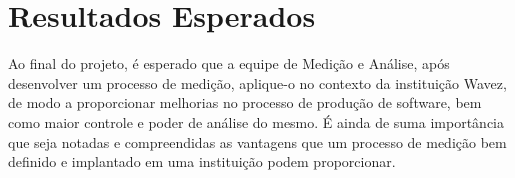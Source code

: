 \chapter{Resultados Esperados}

Ao final do projeto, é esperado que a equipe de Medição e Análise, após desenvolver um processo de medição, aplique-o no contexto da instituição Wavez, de modo a proporcionar melhorias no processo de produção de software, bem como maior controle e poder de análise do mesmo. 
É ainda de suma importância que seja notadas e compreendidas as vantagens que um processo de medição bem definido e implantado em uma instituição podem proporcionar.
